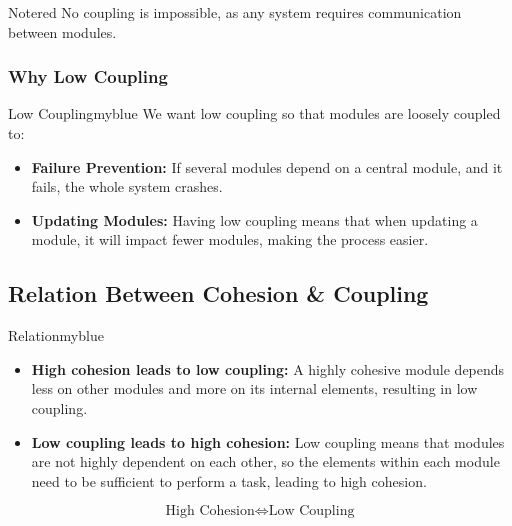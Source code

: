 \begin{prettyBox}{Note}{red}
No coupling is impossible, as any system requires communication between modules.
\end{prettyBox}

\vspace{0.35cm}
\subsubsection{Why Low Coupling}
\begin{prettyBox}{Low Coupling}{myblue}
We want low coupling so that modules are loosely coupled to:
\begin{itemize}
    \item \textbf{Failure Prevention:} If several modules depend on a central module, and it fails, the whole system crashes.
    \item \textbf{Updating Modules:} Having low coupling means that when updating a module, it will impact fewer modules, making the process easier.
\end{itemize}
\end{prettyBox}

\vspace{0.5cm}

\subsection{Relation Between Cohesion \& Coupling}
\begin{prettyBox}{Relation}{myblue}
\begin{itemize}
    \item \textbf{High cohesion leads to low coupling:} A highly cohesive module depends less on other modules and more on its internal elements, resulting in low coupling.
    \item \textbf{Low coupling leads to high cohesion:} Low coupling means that modules are not highly dependent on each other, so the elements within each module need to be sufficient to perform a task, leading to high cohesion.
\end{itemize}

\[\boxed{\text{High Cohesion} \iff \text{Low Coupling}}\]
\end{prettyBox}


